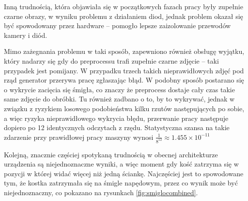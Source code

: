 Inną trudnością, która objawiała się w początkowych fazach pracy były zupełnie czarne obrazy,
w wyniku problemu z działaniem diod, jednak problem okazał się być spowodowany przez hardware --
pomogło lepsze zaizolowanie przewodów kamery i diód.

Mimo zażegnania problemu w taki sposób, zapewniono również obsługę wyjątku,
który nadarzy się gdy do preprocessu trafi zupełnie czarne zdjęcie -- taki przypadek jest pomijany.
W przypadku trzech takich nieprawidłowych zdjęć pod rząd generator przerywa pracę zgłaszając błąd.
W podobny sposób postarano się o wykrycie zacięcia się śmigła,
co znaczy że preprocess dostaje cały czas takie same zdjęcie do obróbki.
Tu również zadbano o to, by to wykrywać, jednak w związku z ryzykiem losowego podobieństwa kilku rzutów następujących po sobie,
a więc ryzyka nieprawidłowego wykrycia błędu, %
przerwanie pracy następuje dopiero po 12 identycznych odczytach z rzędu.
Statystyczna szansa na takie zdarzenie przy prawidłowej pracy maszyny wynosi
$\frac{1}{8^{12}} \approx 1.455 \times 10^{-11}$


Kolejną, znacznie częściej spotykaną trudnością w obecnej architekturze urządzenia są niejednoznaczne wyniki,
a więc moment gdy kość zatrzyma się w pozycji w której widać więcej niż jedną ściankę.
Najczęściej jest to spowodowane tym, że kostka zatrzymała się na śmigle napędowym,
przez co wynik może być niejednoznaczny, co pokazano na rysunkach \ref{fig:smiglocombined}.

